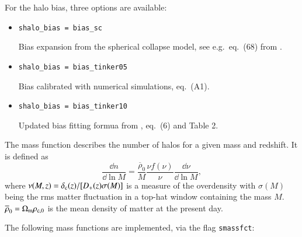 \documentclass[11pt, chapterprefix, headsepline]{scrartcl}
\begin{document}

For the halo bias, three options are available:

\begin{itemize}

  \item \texttt{shalo\_bias = bias\_sc}

	Bias expansion from the spherical collapse model,
  	see e.g.~eq.~(68) from \cite{2002PhR...372....1C}.

  \item \texttt{shalo\_bias = bias\_tinker05}

	Bias calibrated with numerical simulations,
        \cite{2005ApJ...631...41T} eq.~(A1).

  \item \texttt{shalo\_bias = bias\_tinker10}

	Updated bias fitting formua from \cite{2010ApJ...724..878T}, eq.~(6) and Table 2.

\end{itemize}


The mass function describes the number of halos for a given mass and
redshift. It is defined as
%
\begin{equation}
  \frac{\dd n}{\dd \ln M} = \frac{ \overline{\rho}_0}{M} \frac{\nu f(\nu)}{\nu}
  \frac{\dd \nu}{\dd \ln M},
\end{equation}
%
where $\nu(M, z) = \delta_{\rm c}(z) / [D_+(z) \sigma(M)]$ is a
measure of the overdensity with $\sigma(M)$ being the rms matter fluctuation in a top-hat
window containing the mass $M$. $\overline{\rho}_0 = \Omega_{\rm m} \rho_{\rm
  c, 0}$ is the mean density of matter at the present day.

The following mass functions are implemented, via the flag \texttt{smassfct}:
\end{document}
